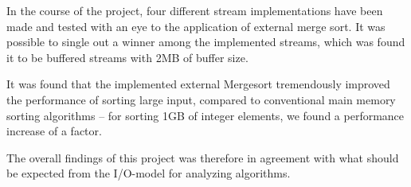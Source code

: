 In the course of the project, four different stream implementations
have been made and tested with an eye to the application of external
merge sort. It was possible to single out a winner among the
implemented streams, which was found it to be buffered streams with
2MB of buffer size.

It was found that the implemented external Mergesort tremendously improved the
performance of sorting large input, compared to conventional main
memory sorting algorithms -- for sorting 1GB of integer elements, we
found a performance increase of a factor.

The overall findings of this project was therefore in agreement with
what should be expected from the I/O-model for analyzing algorithms.
